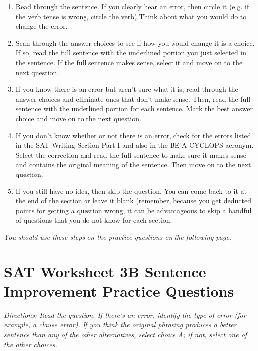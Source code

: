 \documentclass[12pt]{book}
\begin{document}
\begin{center}
\begin{enumerate}
\item{Read through the sentence. If you clearly hear an error, then circle it (e.g. if the verb tense is wrong, circle the verb).Think about what you would do to change the error. }
\item{Scan through the answer choices to see if how you would change it is a choice. If so, read the full sentence with the underlined portion you just selected in the sentence. If the full sentence makes sense, select it and move on to the next question. }
\item{If you know there is an error but aren't sure what it is, read through the answer choices and eliminate ones that don't make sense. Then, read the full sentence with the underlined portion for each sentence. Mark the best answer choice and move on to the next question.} 
\item{If you don't know whether or not there is an error, check for the errors listed in the SAT Writing Section Part I and also in the BE A CYCLOPS acronym.\\
Select the correction and read the full sentence to make sure it makes sense and contains the original meaning of the sentence.  Then move on to the next question.  }
\item{If you still have no idea, then skip the question. You can come back to it at the end of the section or leave it blank (remember, because you get deducted points for getting a question wrong, it can be advantageous to skip a handful of questions that you do not know for each section. }
\end{enumerate}
\end{center}

\bigskip
\textit{You should use these steps on the practice questions on the following page.}
\pagebreak

\section[Sentence Improvement Practice]{SAT Worksheet 3B Sentence Improvement Practice Questions}
\textit{Directions: Read the question. If there's an error, identify the type of error (for example, a clause error). If you think the original phrasing produces a better sentence than any of the other alternatives, select choice A; if not, select one of the other choices.}
\end{document}
